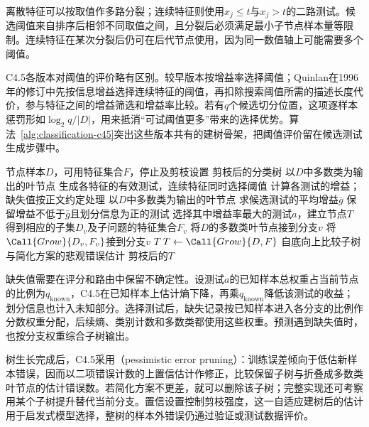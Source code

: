 离散特征可以按取值作多路分裂；连续特征则使用$x_j\leq t$与$x_j>t$的二路测试。候选阈值来自排序后相邻不同取值之间，且分裂后必须满足最小子节点样本量等限制。连续特征在某次分裂后仍可在后代节点使用，因为同一数值轴上可能需要多个阈值。

C4.5各版本对阈值的评价略有区别。较早版本按增益率选择阈值；Quinlan在1996年的修订中先按信息增益选择连续特征的阈值，再扣除搜索阈值所需的描述长度代价，参与特征之间的增益筛选和增益率比较。若有$q$个候选切分位置，这项逐样本惩罚形如$\log_2 q/|D|$，用来抵消“可试阈值更多”带来的选择优势。算法~\ref{alg:classification-c45}突出这些版本共有的建树骨架，把阈值评价留在候选测试生成步骤中。

\begin{algorithm}[C4.5的递归生长与后剪枝]
  \label{alg:classification-c45}
  \begin{algorithmic}[1]
    \Require 节点样本$D$，可用特征集合$F$，停止及剪枝设置
    \Ensure 剪枝后的分类树
        \State \Return 以$D$中多数类为输出的叶节点
      \EndIf
      \State 生成各特征的有效测试，连续特征同时选择阈值
      \State 计算各测试的增益；缺失值按正文约定处理
        \State \Return 以$D$中多数类为输出的叶节点
      \EndIf
      \State 求候选测试的平均增益$\bar g$
      \State 保留增益不低于$\bar g$且划分信息为正的测试
      \State 选择其中增益率最大的测试$a$，建立节点$T$
        \State 得到相应的子集$D_v$及子问题的特征集合$F_v$
          \State 将$D$的多数类叶节点接到分支$v$
        \Else
          \State 将$\Call{Grow}{D_v,F_v}$接到分支$v$
        \EndIf
      \EndFor
      \State \Return $T$
    \EndFunction
    \State $T\gets\Call{Grow}{D,F}$
    \State 自底向上比较子树与简化方案的悲观错误估计
    \State \Return 剪枝后的$T$
  \end{algorithmic}
\end{algorithm}

缺失值需要在评分和路由中保留不确定性。设测试$a$的已知样本总权重占当前节点的比例为$q_{\mathrm{known}}$，C4.5在已知样本上估计熵下降，再乘$q_{\mathrm{known}}$降低该测试的收益；划分信息也计入未知部分。选择测试后，缺失记录按已知样本进入各分支的比例作分数权重分配，后续熵、类别计数和多数类都使用这些权重。预测遇到缺失值时，也按分支权重综合子树输出。

树生长完成后，C4.5采用（pessimistic error pruning）：训练误差倾向于低估新样本错误，因而以二项错误计数的上置信估计作修正，比较保留子树与折叠成多数类叶节点的估计错误数。若简化方案不更差，就可以删除该子树；完整实现还可考察用某个子树提升替代当前分支。置信设置控制剪枝强度，这一自适应建树后的估计用于启发式模型选择，整树的样本外错误仍通过验证或测试数据评价。

